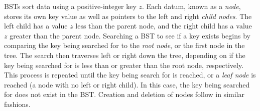 \documentclass[paper,11pt]{AAS}
\begin{document}
BSTs \cite{BST} sort data using a positive-integer key $z$. Each datum, known as a \textit{node}, stores its own key value as well as pointers to the left and right \textit{child nodes}. The left child has a value $z$ less than the parent node, and the right child has a value $z$ greater than the parent node. Searching a BST to see if a key exists begins by comparing the key being searched for to the \textit{root node}, or the first node in the tree. The search then traverses left or right down the tree, depending on if the key being searched for is less than or greater than the root node, respectively. This process is repeated until the key being search for is reached, or a \textit{leaf node} is reached (a node with no left or right child). In this case, the key being searched for does not exist in the BST. Creation and deletion of nodes follow in similar fashions.
\end{document}
